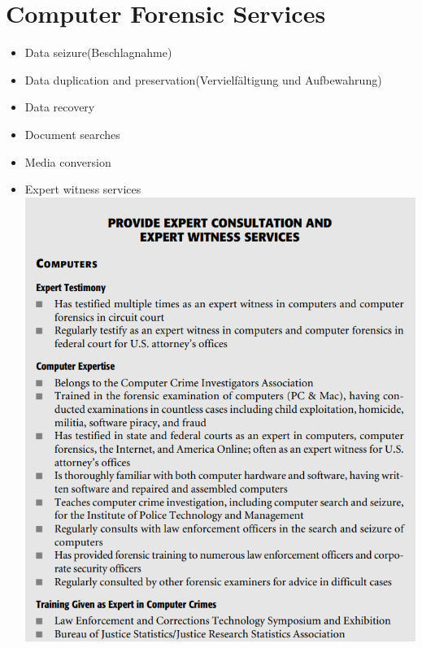 \documentclass{scrreprt}
\begin{document}
\section{Computer Forensic Services}
\begin{itemize}
\item Data seizure(Beschlagnahme)
\item Data duplication and preservation(Vervielfältigung und Aufbewahrung)
\item Data recovery
\item Document searches
\item Media conversion
\item Expert witness services
\\\includegraphics[width=1\textwidth]{"graphics/expertwitnesservices"}

\end{itemize}
\end{document}
